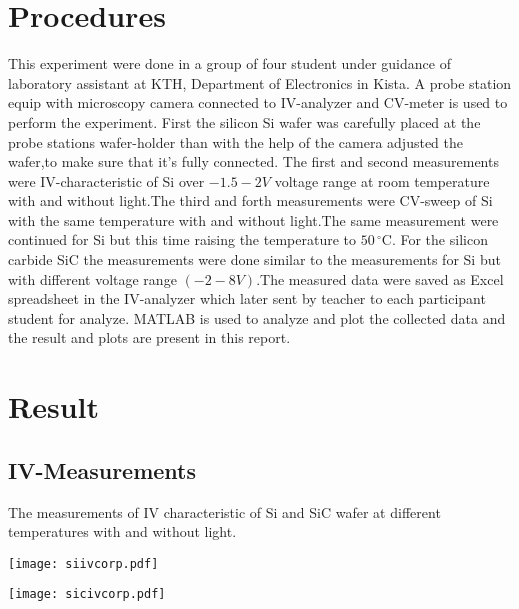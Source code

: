 \documentclass[letterpaper,12pt]{article}
\begin{document}
\section{Procedures}
This experiment were done in a group of four student under guidance of laboratory assistant at KTH, Department of Electronics in Kista. A probe station equip with microscopy camera connected to IV-analyzer and CV-meter is used to perform the experiment. First the silicon Si wafer was carefully placed at the probe stations wafer-holder than with the help of the camera adjusted the wafer,to make sure that it's fully connected.
The first and second measurements were IV-characteristic of Si over $-1.5-2 V$ voltage range at room temperature with and without light.The third and forth measurements were CV-sweep of Si with the same temperature with and without light.The same measurement were continued for Si but this time raising the temperature to  $50\,^{\circ}\mathrm{C}$. For the silicon carbide SiC the measurements were done similar to the measurements for Si but with different voltage range $(-2-8 V)$.The measured data were saved as Excel spreadsheet in the IV-analyzer which later sent by teacher to each participant student for analyze. MATLAB is used to analyze and plot the collected data and the result and plots are present in this report.
\section{Result}
\subsection{IV-Measurements}
The measurements of IV characteristic of Si and SiC wafer at different temperatures with and without light.

\noindent%
 \begin{minipage}[b]{0.48\textwidth}
    \texttt{[image: siivcorp.pdf]}
    \label{visina8}%
    \label{fig:1}
\end{minipage}
\begin{minipage}[b]{0.48\textwidth}
    \texttt{[image: sicivcorp.pdf]}
     \label{visina8}%
    \label{fig:2}
\end{minipage}
\end{document}

